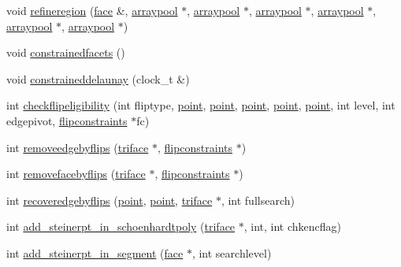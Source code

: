 \begin{DoxyCompactItemize}
\item 
void \hyperlink{classtetgenmesh_aa34a5188a4cee82197394560c388c348}{refineregion} (\hyperlink{classtetgenmesh_1_1face}{face} \&, \hyperlink{classtetgenmesh_1_1arraypool}{arraypool} $\ast$, \hyperlink{classtetgenmesh_1_1arraypool}{arraypool} $\ast$, \hyperlink{classtetgenmesh_1_1arraypool}{arraypool} $\ast$, \hyperlink{classtetgenmesh_1_1arraypool}{arraypool} $\ast$, \hyperlink{classtetgenmesh_1_1arraypool}{arraypool} $\ast$, \hyperlink{classtetgenmesh_1_1arraypool}{arraypool} $\ast$)
\item 
void \hyperlink{classtetgenmesh_a7579c3a44a54712623d9f9e5fc1dfbdc}{constrainedfacets} ()
\item 
void \hyperlink{classtetgenmesh_aab64d62b3d2b048a38158fb2bf678624}{constraineddelaunay} (clock\+\_\+t \&)
\item 
int \hyperlink{classtetgenmesh_afa19bcc54b58a65b05bf43cceaec68ec}{checkflipeligibility} (int fliptype, \hyperlink{classtetgenmesh_ace3fb4f80389185b7c9b18ab69a3dea2}{point}, \hyperlink{classtetgenmesh_ace3fb4f80389185b7c9b18ab69a3dea2}{point}, \hyperlink{classtetgenmesh_ace3fb4f80389185b7c9b18ab69a3dea2}{point}, \hyperlink{classtetgenmesh_ace3fb4f80389185b7c9b18ab69a3dea2}{point}, \hyperlink{classtetgenmesh_ace3fb4f80389185b7c9b18ab69a3dea2}{point}, int level, int edgepivot, \hyperlink{classtetgenmesh_1_1flipconstraints}{flipconstraints} $\ast$fc)
\item 
int \hyperlink{classtetgenmesh_aa3b3b69fbbdda1fcce103640425f9694}{removeedgebyflips} (\hyperlink{classtetgenmesh_1_1triface}{triface} $\ast$, \hyperlink{classtetgenmesh_1_1flipconstraints}{flipconstraints} $\ast$)
\item 
int \hyperlink{classtetgenmesh_a74795dd220990bdcf206cdc6686ab336}{removefacebyflips} (\hyperlink{classtetgenmesh_1_1triface}{triface} $\ast$, \hyperlink{classtetgenmesh_1_1flipconstraints}{flipconstraints} $\ast$)
\item 
int \hyperlink{classtetgenmesh_a558494ab92a7012fae3cfe96bb33f8e9}{recoveredgebyflips} (\hyperlink{classtetgenmesh_ace3fb4f80389185b7c9b18ab69a3dea2}{point}, \hyperlink{classtetgenmesh_ace3fb4f80389185b7c9b18ab69a3dea2}{point}, \hyperlink{classtetgenmesh_1_1triface}{triface} $\ast$, int fullsearch)
\item 
int \hyperlink{classtetgenmesh_acb5fc751eaa4a4ddffbebedfa7b7382a}{add\+\_\+steinerpt\+\_\+in\+\_\+schoenhardtpoly} (\hyperlink{classtetgenmesh_1_1triface}{triface} $\ast$, int, int chkencflag)
\item 
int \hyperlink{classtetgenmesh_a3de6e9d82e74671af7f038043b5e9bcc}{add\+\_\+steinerpt\+\_\+in\+\_\+segment} (\hyperlink{classtetgenmesh_1_1face}{face} $\ast$, int searchlevel)

\end{DoxyCompactItemize}
